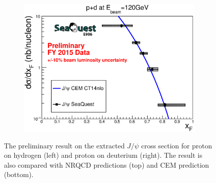 \documentclass[10pt, a4paper,final]{article}
\begin{document}
\begin{figure}[htbp!]
\begin{subfigure}{0.45\linewidth}
	\end{subfigure}
	\begin{subfigure}{0.45\linewidth}
		\includegraphics[width=0.9\linewidth]{jpsi_xF_LD2_CEM}
	\end{subfigure}
	\caption{The preliminary result on the extracted $J/\psi$ cross section for
		proton on hydrogen (left) and proton on deuterium (right). The result is
		also compared with NRQCD predictions (top) and CEM prediction (bottom).}
	\label{fig:abs_cs_NRQCD}
\end{figure}
\end{document}

